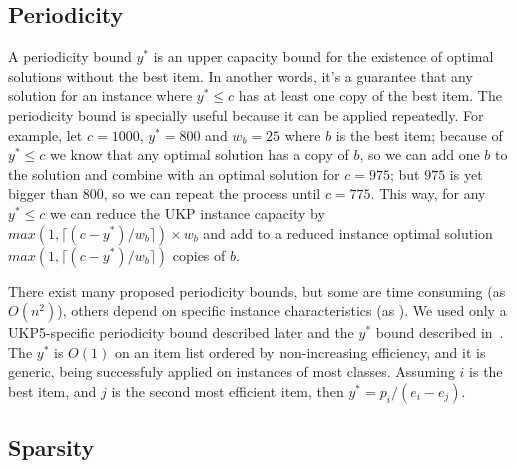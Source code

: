 \documentclass[runningheads,a4paper]{llncs}
\begin{document}



\subsection{Periodicity}

A periodicity bound \(y^{*}\) is an upper capacity bound for the existence of optimal solutions without the best item. 
In another words, it's a guarantee that any solution for an instance where \(y^{*} \leq c\) has at least one copy of the best item. 
The periodicity bound is specially useful because it can be applied repeatedly. 
For example, let \(c = 1000\), \(y^{*} = 800\) and \(w_b = 25\) where \(b\) is the best item; because of \(y^{*} \leq c\) we know that any optimal solution has a copy of \(b\), so we can add one \(b\) to the solution and combine with an optimal solution for \(c = 975\); but \(975\) is yet bigger than \(800\), so we can repeat the process until \(c = 775\). 
This way, for any \(y^{*} \leq c\) we can reduce the UKP instance capacity by \(max(1, \lceil(c-y^{*})/w_b\rceil)\times w_b\) and add to a reduced instance optimal solution \(max(1, \lceil(c-y^{*})/w_b\rceil)\) copies of \(b\).

There exist many proposed periodicity bounds, but some are time consuming (as \(O(n^2)\)\cite{badbound1}), others depend on specific instance characteristics (as \cite{badbound2}\cite{pya}).
We used only a UKP5-specific periodicity bound described later and the \(y^{*}\) bound described in~\cite[p. 223]{gar72}.
The $y^*$ is \(O(1)\) on an item list ordered by non-increasing efficiency,  and it is generic, being successfuly applied on instances of most classes.
Assuming $i$ is the best item, and $j$ is the second most efficient item, then \mbox{\(y^{*} = p_i / (e_i - e_j)\)}.




\subsection{Sparsity}
\end{document}
